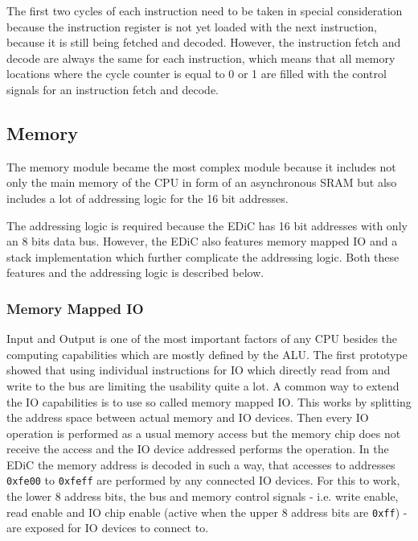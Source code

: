 The first two cycles of each instruction need to be taken in special consideration because the instruction register is not yet loaded with the next instruction, because it is still being fetched and decoded.
However, the instruction fetch and decode are always the same for each instruction, which means that all memory locations where the cycle counter is equal to 0 or 1 are filled with the control signals for an instruction fetch and decode.

\subsection{Memory}\label{sec:memory}
The memory module became the most complex module because it includes not only the main memory of the \gls{CPU} in form of an asynchronous \gls{SRAM} but also includes a lot of addressing logic for the 16 bit addresses.

The addressing logic is required because the \gls{EDiC} has 16 bit addresses with only an 8 bits data bus.
However, the \gls{EDiC} also features memory mapped \gls{IO} and a stack implementation which further complicate the addressing logic.
Both these features and the addressing logic is described below.

\subsubsection{Memory Mapped \gls{IO}}
Input and Output is one of the most important factors of any \gls{CPU} besides the computing capabilities which are mostly defined by the \gls{ALU}.
The first prototype showed that using individual instructions for \gls{IO} which directly read from and write to the bus are limiting the usability quite a lot.
A common way to extend the \gls{IO} capabilities is to use so called memory mapped \gls{IO}.
This works by splitting the address space between actual memory and \gls{IO} devices.
Then every \gls{IO} operation is performed as a usual memory access but the memory chip does not receive the access and the \gls{IO} device addressed performs the operation.
In the \gls{EDiC} the memory address is decoded in such a way, that accesses to addresses \texttt{0xfe00} to \texttt{0xfeff} are performed by any connected \gls{IO} devices.
For this to work, the lower 8 address bits, the bus and memory control signals - i.e. write enable, read enable and \gls{IO} chip enable (active when the upper 8 address bits are \texttt{0xff}) - are exposed for \gls{IO} devices to connect to.


